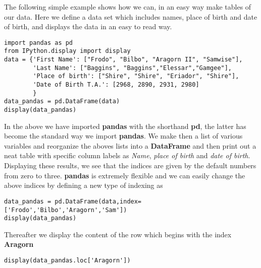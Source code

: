 \documentclass[%
oneside,                 %
final,                   %
10pt]{article}
\begin{document}
The following simple example shows how we can, in an easy way make tables of our data. Here we define a data set which includes names, place of birth and date of birth, and displays the data in an easy to read way. 











\begin{verbatim}
import pandas as pd
from IPython.display import display
data = {'First Name': ["Frodo", "Bilbo", "Aragorn II", "Samwise"],
        'Last Name': ["Baggins", "Baggins","Elessar","Gamgee"],
        'Place of birth': ["Shire", "Shire", "Eriador", "Shire"],
        'Date of Birth T.A.': [2968, 2890, 2931, 2980]
        }
data_pandas = pd.DataFrame(data)
display(data_pandas)

\end{verbatim}


In the above we have imported \textbf{pandas} with the shorthand \textbf{pd}, the latter has become the standard way we import \textbf{pandas}. We make then a list of various variables
and reorganize the aboves lists into a \textbf{DataFrame} and then print out  a neat table with specific column labels as \emph{Name}, \emph{place of birth} and \emph{date of birth}.
Displaying these results, we see that the indices are given by the default numbers from zero to three.
\textbf{pandas} is extremely flexible and we can easily change the above indices by defining a new type of indexing as



\begin{verbatim}
data_pandas = pd.DataFrame(data,index=['Frodo','Bilbo','Aragorn','Sam'])
display(data_pandas)

\end{verbatim}

Thereafter we display the content of the row which begins with the index \textbf{Aragorn}


\begin{verbatim}
display(data_pandas.loc['Aragorn'])

\end{verbatim}
\end{document}
